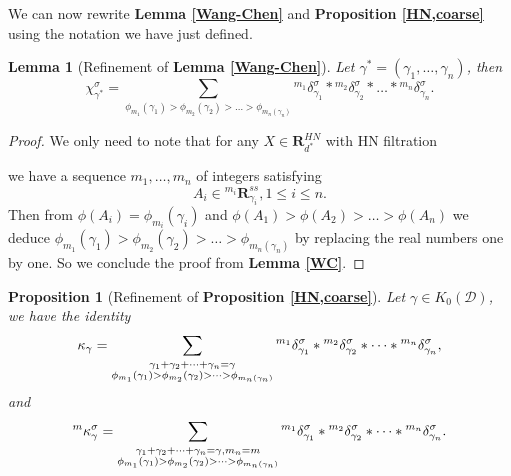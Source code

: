 \documentclass[a4paper,12pt]{amsart}
\newtheorem{lemma}[theorem]{Lemma}
\newtheorem{proposition}[theorem]{Proposition}
\begin{document}
We can now rewrite \textbf{Lemma \ref{Wang-Chen}} and \textbf{Proposition \ref{HN,coarse}} using the notation we have just defined.

\begin{lemma}[Refinement of \textbf{Lemma \ref{Wang-Chen}}]
    Let $\gamma^*=(\gamma_1,\dots,\gamma_n)$, then
    \[\chi^\sigma_{\gamma^*}=\sum_{\phi_{m_1}(\gamma_1)>\phi_{m_2}(\gamma_2)>\dots>\phi_{m_n(\gamma_n)}}{^{m_1}}\delta^\sigma_{\gamma_1}*{^{m_2}}\delta^\sigma_{\gamma_2}*\dots*{^{m_n}}\delta^\sigma_{\gamma_n}.\]
\end{lemma}
\begin{proof}
    We only need to note that for any $X\in\mathbf{R}_{d^*}^{HN}$ with HN filtration
    \begin{center}
    \end{center}
    we have a sequence $m_1,\dots,m_n$ of integers satisfying
    \[A_i\in{^{m_i}}\mathbf{R}_{\gamma_i}^{ss},1\leqslant i\leqslant n.\]
    Then from $\phi(A_i)=\phi_{m_i}(\gamma_i)$ and $\phi(A_1)>\phi(A_2)>\dots>\phi(A_n)$ we deduce $\phi_{m_1}(\gamma_1)>\phi_{m_2}(\gamma_2)>\dots>\phi_{m_n(\gamma_n)}$ by replacing the real numbers one by one. So we conclude the proof from \textbf{Lemma \ref{WC}}.
\end{proof}
\begin{proposition}[Refinement of \textbf{Proposition \ref{HN,coarse}}]\label{HN,fine}
    Let $\gamma\in K_0(\mathcal{D})$, we have the identity
    \[\kappa_\gamma=\sum_{\begin{subarray}{c}
         \\  {\gamma_1+\gamma_2+\dots+\gamma_n=\gamma}\\{\phi_{m_1}(\gamma_1)>\phi_{m_2}(\gamma_2)>\dots>\phi_{m_n(\gamma_n)}}
    \end{subarray}}{^{m_1}}\delta^\sigma_{\gamma_1}*{^{m_2}}\delta^\sigma_{\gamma_2}*\dots*{^{m_n}}\delta^\sigma_{\gamma_n},\]
    and
    \[{^m}\kappa^\sigma_\gamma=\sum_{\begin{subarray}{c}
         \\  {\gamma_1+\gamma_2+\dots+\gamma_n=\gamma},m_n=m\\{\phi_{m_1}(\gamma_1)>\phi_{m_2}(\gamma_2)>\dots>\phi_{m_n(\gamma_n)}}
    \end{subarray}}{^{m_1}}\delta^\sigma_{\gamma_1}*{^{m_2}}\delta^\sigma_{\gamma_2}*\dots*{^{m_n}}\delta^\sigma_{\gamma_n}.\]
\end{proposition}
\end{document}
